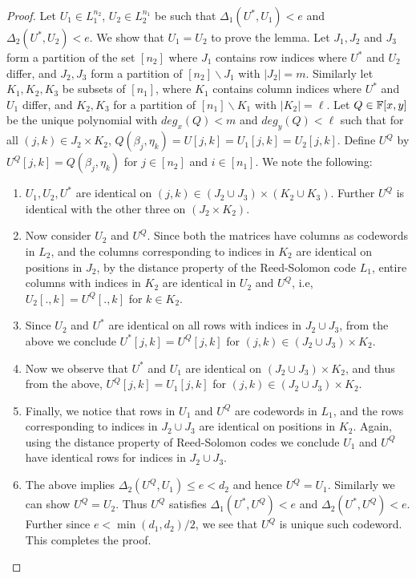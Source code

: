 \begin{proof}
Let $U_1\in L_1^{n_2}$, $U_2\in L_2^{n_1}$ be such that
$\Delta_1(U^\ast,U_1)<e$ and $\Delta_2(U^\ast,U_2)<e$. We show that $U_1=U_2$
to prove the lemma. Let $J_1,J_2$ and $J_3$ form a partition of the set $[n_2]$
where $J_1$ contains row indices where $U^\ast$ and $U_2$ differ, and $J_2,J_3$
form a partition of $[n_2]\backslash J_1$ with $|J_2|=m$. Similarly let
$K_1,K_2,K_3$ be subsets of $[n_1]$, where $K_1$ contains column indices where
$U^\ast$ and $U_1$ differ, and $K_2,K_3$ for a partition of $[n_1]\backslash
K_1$ with $|K_2|=\ell$. Let $Q\in \mathbb{F}[x,y]$ be the unique polynomial with
$deg_x(Q)<m$ and $deg_y(Q)<\ell$ such that for all $(j,k)\in J_2\times K_2$,
$Q(\beta_j,\eta_k)=U[j,k]=U_1[j,k]=U_2[j,k]$. Define $U^Q$ by
$U^Q[j,k]=Q(\beta_j,\eta_k)$ for $j\in [n_2]$ and $i\in [n_1]$. We note the
following:
\begin{enumerate}[{\rm 1.}]
\item $U_1,U_2,U^\ast$ are identical on $(j,k)\in (J_2\cup J_3)\times (K_2\cup
K_3)$. Further $U^Q$ is identical with the other three on $(J_2\times K_2)$.
\item Now consider $U_2$ and $U^Q$. Since both the matrices have columns as
codewords in $L_2$, and the columns corresponding to indices in $K_2$ are
identical on positions in $J_2$, by the distance property of the Reed-Solomon
code $L_1$, entire columns with indices in $K_2$ are identical in $U_2$ and
$U^Q$, i.e, $U_2[.,k]=U^Q[.,k]$ for $k\in K_2$.
\item Since $U_2$ and $U^\ast$ are identical on all rows with indices in
$J_2\cup J_3$, from the above we conclude $U^\ast[j,k]=U^Q[j,k]$ for $(j,k)\in
(J_2\cup J_3)\times K_2$.
\item Now we observe that $U^\ast$ and $U_1$ are identical on $(J_2\cup
J_3)\times K_2$, and thus from the above, $U^Q[j,k]=U_1[j,k]$ for $(j,k)\in
(J_2\cup J_3)\times K_2$.
\item Finally, we notice that rows in $U_1$ and $U^Q$ are codewords in $L_1$,
and the rows corresponding to indices in $J_2\cup J_3$ are identical on
positions in $K_2$. Again, using the distance property of Reed-Solomon codes we
conclude $U_1$ and $U^Q$ have identical rows for indices in $J_2\cup J_3$. 
\item The above implies $\Delta_2(U^Q,U_1)\leq e < d_2$ and hence $U^Q=U_1$.
Similarly we can show $U^Q=U_2$. Thus $U^Q$ satisfies $\Delta_1(U^\ast,U^Q)<e$
and $\Delta_2(U^\ast,U^Q)<e$. Further since $e < \min(d_1,d_2)/2$, we see that
$U^Q$ is unique such codeword. This completes the proof.
\end{enumerate}
\end{proof}

